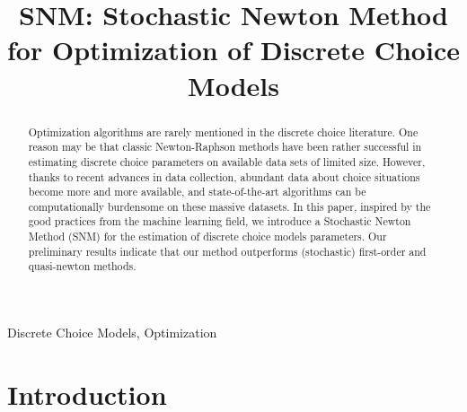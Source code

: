 \documentclass[conference]{IEEEtran}
\begin{document}
\title{SNM: Stochastic Newton Method for Optimization of Discrete Choice Models}

\author{

\and
{}
\and
{}
}

\maketitle

\begin{abstract}
Optimization algorithms are rarely mentioned in the discrete choice literature. One reason may be that classic Newton-Raphson methods have been rather successful in estimating discrete choice parameters on available data sets of limited size. However, thanks to recent advances in data collection, abundant data about choice situations become more and more available, and state-of-the-art algorithms can be computationally burdensome on these massive datasets.  In this paper, inspired by the good practices from the machine learning field, we introduce a Stochastic Newton Method (SNM) for the estimation of discrete choice models parameters. Our preliminary results indicate that our method outperforms (stochastic) first-order and quasi-newton methods. 
\end{abstract}

\begin{IEEEkeywords}
Discrete Choice Models, Optimization
\end{IEEEkeywords}

\section{Introduction}
\label{sec:intro}
\end{document}
